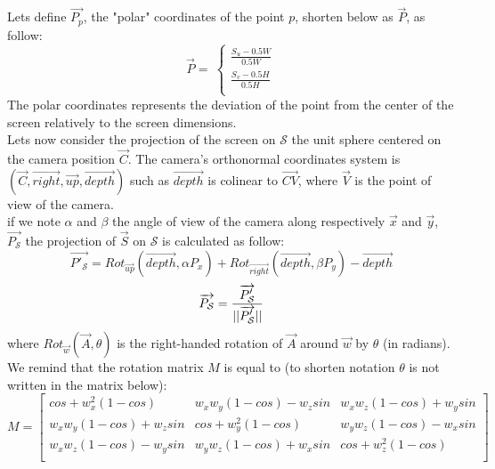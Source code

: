Lets define $\overrightarrow{P_p}$, the "polar" coordinates of the point $p$, shorten below as $\overrightarrow{P}$, as follow:\\
\begin{equation}
\overrightarrow{P}=\
\left\lbrace\begin{array}{l}
\frac{S_u-0.5W}{0.5W}\\
\frac{S_v-0.5H}{0.5H}\\
\end{array}\right.
\end{equation}
The polar coordinates represents the deviation of the point from the center of the screen relatively to the screen dimensions.\\

Lets now consider the projection of the screen on $\mathcal{S}$ the unit sphere centered on the camera position $\overrightarrow{C}$. The camera's orthonormal coordinates system is $(\overrightarrow{C},\overrightarrow{right},\overrightarrow{up},\overrightarrow{depth})$ such as $\overrightarrow{depth}$ is colinear to $\overrightarrow{CV}$, where $\overrightarrow{V}$ is the point of view of the camera.\\

if we note $\alpha$ and $\beta$ the angle of view of the camera along respectively $\overrightarrow{x}$ and $\overrightarrow{y}$, $\overrightarrow{P_{\mathcal{S}}}$ the projection of 
$\overrightarrow{S}$ on $\mathcal{S}$ is calculated as follow:\\
\begin{equation}
\overrightarrow{P'_{\mathcal{S}}}=Rot_{\overrightarrow{up}}(\overrightarrow{depth},\alpha P_x)+Rot_{\overrightarrow{right}}(\overrightarrow{depth},\beta P_y)-\overrightarrow{depth}
\end{equation}
\begin{equation}
\overrightarrow{P_{\mathcal{S}}}=\frac{\overrightarrow{P'_{\mathcal{S}}}}{||\overrightarrow{P'_{\mathcal{S}}}||}\\
\end{equation}
where $Rot_{\overrightarrow{w}}(\overrightarrow{A}, \theta)$ is the right-handed rotation of $\overrightarrow{A}$ around $\overrightarrow{w}$ by $\theta$ (in radians). We remind that the rotation matrix $M$ is equal to (to shorten notation $\theta$ is not written in the matrix below):\\
\begin{equation}
M=\left[
\begin{array}{ccc}
cos+w_x^2(1-cos)&w_xw_y(1-cos)-w_zsin&w_xw_z(1-cos)+w_ysin\\
w_xw_y(1-cos)+w_zsin&cos+w_y^2(1-cos)&w_yw_z(1-cos)-w_xsin\\
w_xw_z(1-cos)-w_ysin&w_yw_z(1-cos)+w_xsin&cos+w_z^2(1-cos)\\
\end{array}
\right]
\end{equation}

